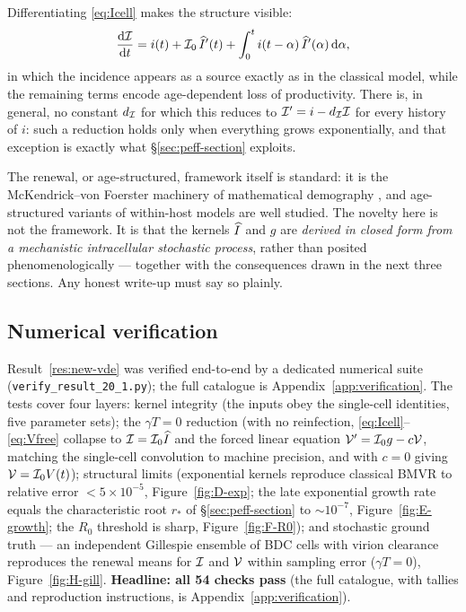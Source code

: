 Differentiating \eqref{eq:Icell} makes the structure visible:
\begin{equation}
\displaystyle\frac{{\rm d} \mathcal{I}}{{\rm d} t}
= i(t)+\mathcal{I}_0\,\widehat{I}'(t)+\int_0^t i(t-\alpha)\,\widehat{I}'(\alpha)\,{\rm d}\alpha,
\end{equation}
in which the incidence appears as a source exactly as in the classical
model, while the remaining terms encode age-dependent loss of
productivity. There is, in general, no constant $d_{\mathcal{I}}$ for which this
reduces to $\mathcal{I}'=i-d_{\mathcal{I}}\mathcal{I}$ for every history of $i$: such a
reduction holds only when everything grows exponentially, and that exception
is exactly what \S\ref{sec:peff-section} exploits.

\begin{remark}
\label{rem:novelty}
The renewal, or age-structured, framework itself is standard: it is the
McKendrick--von Foerster machinery of mathematical demography
\cite{mckendrick1926applications,vonfoerster1959some}, and age-structured
variants of within-host models are well studied. The novelty here is not
the framework. It is that the kernels $\widehat{I}$ and $g$ are \emph{derived in
closed form from a mechanistic intracellular stochastic process}, rather
than posited phenomenologically --- together with the consequences drawn in
the next three sections. Any honest write-up must say so plainly.
\end{remark}

\subsection{Numerical verification}
\label{sec:renewal-verification}

Result~\ref{res:new-vde} was verified end-to-end by a dedicated numerical
suite (\texttt{verify\_result\_20\_1.py}); the full catalogue is
Appendix~\ref{app:verification}. The tests cover four layers: kernel
integrity (the inputs obey the single-cell identities, five parameter
sets); the $\gamma T=0$ reduction (with no reinfection, \eqref{eq:Icell}--
\eqref{eq:Vfree} collapse to $\mathcal{I}=\mathcal{I}_0\widehat{I}$ and the forced linear
equation $\mathcal{V}'=\mathcal{I}_0 g-c\mathcal{V}$, matching the single-cell
convolution to machine precision, and with $c=0$ giving
$\mathcal{V}=\mathcal{I}_0 V(t)$); structural limits (exponential kernels reproduce
classical BMVR to relative error $<5\times10^{-5}$,
Figure~\ref{fig:D-exp}; the late exponential growth rate equals the
characteristic root $r_*$ of \S\ref{sec:peff-section} to $\sim10^{-7}$,
Figure~\ref{fig:E-growth}; the $R_0$ threshold is sharp,
Figure~\ref{fig:F-R0}); and stochastic ground truth --- an independent
Gillespie ensemble of BDC cells with virion clearance reproduces the
renewal means for $\mathcal{I}$ and $\mathcal{V}$ within sampling error
($\gamma T=0$), Figure~\ref{fig:H-gill}. \textbf{Headline: all 54 checks
pass} (the full catalogue, with tallies and reproduction instructions, is
Appendix~\ref{app:verification}).

